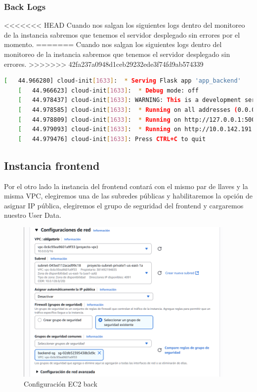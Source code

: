 \documentclass{article}
\begin{document}
	\subsubsection{Back Logs}
<<<<<<< HEAD
	Cuando nos salgan los siguientes logs dentro del monitoreo de la instancia sabremos que tenemos el servidor desplegado sin errores por el momento.
=======
	Cuando nos salgan los siguientes logs dentro del monitoreo de la instancia sabremos que tenemos el servidor desplegado sin errores.
>>>>>>> 42fa237a0948d1ceb29232ede3f74fd9ab574339

	\begin{lstlisting}[style=consola, language=bash, caption={back logs}]
	[   44.966280] cloud-init[1633]:  * Serving Flask app 'app_backend'
	[   44.966623] cloud-init[1633]:  * Debug mode: off
	[   44.978437] cloud-init[1633]: WARNING: This is a development server. Do not use it in a production deployment. Use a production WSGI server instead.
	[   44.978585] cloud-init[1633]:  * Running on all addresses (0.0.0.0)
	[   44.978809] cloud-init[1633]:  * Running on http://127.0.0.1:5000
	[   44.979093] cloud-init[1633]:  * Running on http://10.0.142.191:5000
	[   44.979476] cloud-init[1633]: Press CTRL+C to quit\end{lstlisting}

	\subsection{Instancia frontend}

	Por el otro lado la instancia del frontend contará con el mismo par de llaves y la misma VPC, elegiremos una de las subredes públicas y habilitaremos la opción de asignar IP pública, elegiremos el grupo de seguridad del frontend y cargaremos nuestro User Data. 

		
	\begin{figure}[H]
	\centering
	\includegraphics[width=0.95\textwidth]{configuracion_ec2_back.png}
	\caption{Configuración EC2 back}
	\end{figure}
\end{document}
